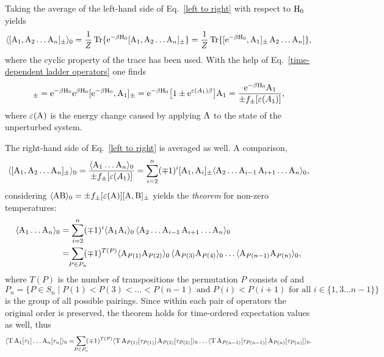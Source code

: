 Taking the average of the left-hand side of Eq.~\ref{left to right} with respect
to $\mathrm H_0$ yields
%
\begin{equation*}
    \langle[\mathrm A_1, \mathrm A_2 \dots \mathrm A_n]_\pm\rangle_0
    = \frac 1 Z \operatorname{Tr} \{
    \mathrm e^{-\beta \mathrm H_0} [ \mathrm A_1, \mathrm A_2 \dots \mathrm A_n ]_\pm \}
    = \frac 1 Z \operatorname{Tr} \{
    [\mathrm e^{-\beta \mathrm H_0}, \mathrm A_1]_\pm \, \mathrm A_2 \dots \mathrm A_n] \},
\end{equation*}
%
where the cyclic property of the trace has been used. With the help of
Eq.~\ref{time-dependent ladder operators} one finds
%
\begin{equation*}
    [\E^{-\beta \op H_0}, \op A_1]_\pm
    = \E^{-\beta \op H_0} \E^{\beta \op H_0} [\E^{-\beta \op H_0}, \op A_1]_\pm
    = \E^{-\beta \op H_0} \big[
        1 \pm \E^{\epsilon(A_1) \beta}
    \big] \op A_1
    = \frac{\E^{-\beta \op H_0} \op A_1}{\pm f_\pm[\epsilon(A_1)]},
\end{equation*}
%
where $\varepsilon(\mathrm A)$ is the energy change caused by applying $\mathrm A$ to the
state of the unperturbed system.

The right-hand side of Eq.~\ref{left to right} is averaged as well. A
comparison,
%
\begin{equation*}
    \langle[\mathrm A_1, \mathrm A_2 \dots \mathrm A_n]_\pm\rangle_0
    = \frac{\langle\mathrm A_1 \dots \mathrm A_n\rangle_0}{\pm f_\pm[\varepsilon(A_1)]}
    = \sum_{i = 2}^n (\mp 1)^i [\mathrm A_1, \mathrm A_i]_\pm
    \langle\mathrm A_2 \dots \mathrm A_{i - 1} \, \mathrm A_{i + 1} \dots \mathrm A_n\rangle_0,
\end{equation*}
%
considering $\langle\mathrm A \mathrm B\rangle_0 = \pm f_\pm[\varepsilon(\mathrm A)] [\mathrm A,
\mathrm B]_\pm$ yields the \emph{ theorem} for non-zero temperatures:
%
\begin{align*}
    \av{\op A_1 \dots \op A_n}_0 &=
    \sum_{i = 2}^n (\mp 1)^i \av{\op A_1 \op A_i}_0 \,
    \av{\op A_2 \dots \op A_{i - 1} \, \op A_{i + 1} \dots \op A_n}_0 \\
    &= \sum_{\mathclap{P \in P_n}} (\mp 1)^{T(P)}
    \av{\op A_{P(1)} \op A_{P(2)}}_0 \,
    \av{\op A_{P(3)} \op A_{P(4)}}_0 \dots
    \av{\op A_{P(n - 1)} \op A_{P(n)}}_0,
\end{align*}
%
where $T(P)$ is the number of transpositions the permutation $P$ consists of and
%
\begin{equation*}
    P_n = \{ P \in S_n \mid
        P(1) < P(3) < \dots < P(n - 1)
        \text{ and }
        P(i) < P(i + 1) \text{ for all $i \in \{1, 3 \dots n - 1\}$}
        \}
\end{equation*}
%
is the group of all possible pairings. Since within each pair of operators the
original order is preserved, the theorem holds for time-ordered expectation
values as well, thus
%
\begin{equation} \label{Wick theorem}
    \av{\op T \, \op A_1[\tau_1] \dots \op A_n[\tau_n]}_0 =
    \sum_{\mathclap{P \in P_n}} (\mp 1)^{T(P)}
    \av{\op T \, \op A_{P(1)}[\tau_{P(1)}] \,
    \op A_{P(2)}[\tau_{P(2)}]}_0 \dots
    \av{\op T \, \op A_{P(n - 1)}[\tau_{P(n - 1)}] \,
    \op A_{P(n)}[\tau_{P(n)}]}_0.
\end{equation}

